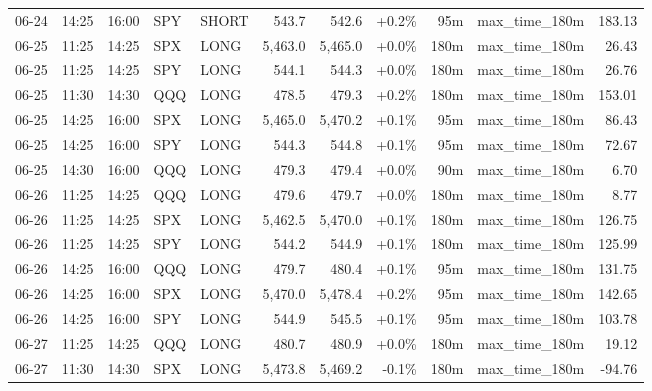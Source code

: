 \documentclass[11pt,a4paper,twoside]{article}
\begin{document}
\begin{center}
\begin{longtable}{>{\color{txtmain}}l l l l l r r r r >{\color{txtmain}}l r}
06-24 & 14:25 & 16:00 & SPY & SHORT & 543.7 & 542.6 & \textcolor{wingreen}{+0.2\%} & 95m & max\_time\_180m & \textcolor{wingreen}{183.13} \\
06-25 & 11:25 & 14:25 & SPX & LONG & 5,463.0 & 5,465.0 & \textcolor{wingreen}{+0.0\%} & 180m & max\_time\_180m & \textcolor{wingreen}{26.43} \\
06-25 & 11:25 & 14:25 & SPY & LONG & 544.1 & 544.3 & \textcolor{wingreen}{+0.0\%} & 180m & max\_time\_180m & \textcolor{wingreen}{26.76} \\
06-25 & 11:30 & 14:30 & QQQ & LONG & 478.5 & 479.3 & \textcolor{wingreen}{+0.2\%} & 180m & max\_time\_180m & \textcolor{wingreen}{153.01} \\
06-25 & 14:25 & 16:00 & SPX & LONG & 5,465.0 & 5,470.2 & \textcolor{wingreen}{+0.1\%} & 95m & max\_time\_180m & \textcolor{wingreen}{86.43} \\
06-25 & 14:25 & 16:00 & SPY & LONG & 544.3 & 544.8 & \textcolor{wingreen}{+0.1\%} & 95m & max\_time\_180m & \textcolor{wingreen}{72.67} \\
06-25 & 14:30 & 16:00 & QQQ & LONG & 479.3 & 479.4 & \textcolor{wingreen}{+0.0\%} & 90m & max\_time\_180m & \textcolor{wingreen}{6.70} \\
06-26 & 11:25 & 14:25 & QQQ & LONG & 479.6 & 479.7 & \textcolor{wingreen}{+0.0\%} & 180m & max\_time\_180m & \textcolor{wingreen}{8.77} \\
06-26 & 11:25 & 14:25 & SPX & LONG & 5,462.5 & 5,470.0 & \textcolor{wingreen}{+0.1\%} & 180m & max\_time\_180m & \textcolor{wingreen}{126.75} \\
06-26 & 11:25 & 14:25 & SPY & LONG & 544.2 & 544.9 & \textcolor{wingreen}{+0.1\%} & 180m & max\_time\_180m & \textcolor{wingreen}{125.99} \\
06-26 & 14:25 & 16:00 & QQQ & LONG & 479.7 & 480.4 & \textcolor{wingreen}{+0.1\%} & 95m & max\_time\_180m & \textcolor{wingreen}{131.75} \\
06-26 & 14:25 & 16:00 & SPX & LONG & 5,470.0 & 5,478.4 & \textcolor{wingreen}{+0.2\%} & 95m & max\_time\_180m & \textcolor{wingreen}{142.65} \\
06-26 & 14:25 & 16:00 & SPY & LONG & 544.9 & 545.5 & \textcolor{wingreen}{+0.1\%} & 95m & max\_time\_180m & \textcolor{wingreen}{103.78} \\
06-27 & 11:25 & 14:25 & QQQ & LONG & 480.7 & 480.9 & \textcolor{wingreen}{+0.0\%} & 180m & max\_time\_180m & \textcolor{wingreen}{19.12} \\
06-27 & 11:30 & 14:30 & SPX & LONG & 5,473.8 & 5,469.2 & \textcolor{lossred}{-0.1\%} & 180m & max\_time\_180m & \textcolor{lossred}{-94.76} \\

\end{longtable}
\end{center}
\end{document}
